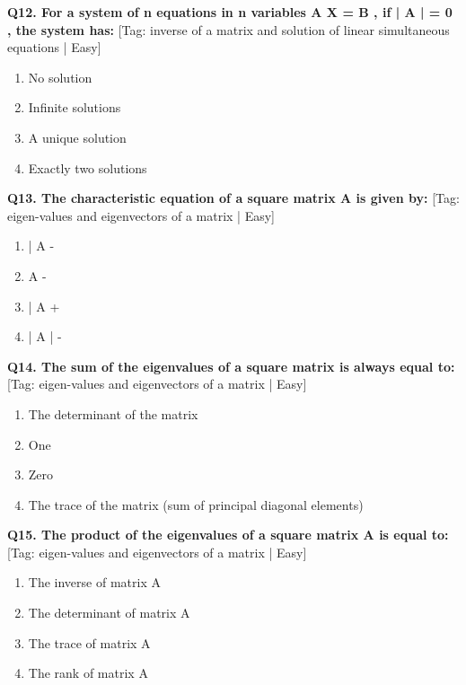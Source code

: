 \noindent\textbf{Q12. For a system of n equations in n variables A X = B , if | A |  = 0 , the system has:} \hfill [Tag: inverse of a matrix and solution of linear simultaneous equations | Easy]
\begin{enumerate}[label=(\alph*),topsep=2pt,itemsep=1pt,partopsep=0pt,parsep=0pt]
    \item {{No solution}}
    \item {{Infinite solutions}}
    \item {{A unique solution}}
    \item {{Exactly two solutions}}
\end{enumerate}
\vspace{2mm}

\noindent\textbf{Q13. The characteristic equation of a square matrix A is given by:} \hfill [Tag: eigen-values and eigenvectors of a matrix | Easy]
\begin{enumerate}[label=(\alph*),topsep=2pt,itemsep=1pt,partopsep=0pt,parsep=0pt]
    \item {{| A -}}
    \item {{A -}}
    \item {{| A +}}
    \item {{| A | -}}
\end{enumerate}
\vspace{2mm}

\noindent\textbf{Q14. The sum of the eigenvalues of a square matrix is always equal to:} \hfill [Tag: eigen-values and eigenvectors of a matrix | Easy]
\begin{enumerate}[label=(\alph*),topsep=2pt,itemsep=1pt,partopsep=0pt,parsep=0pt]
    \item {{The determinant of the matrix}}
    \item {{One}}
    \item {{Zero}}
    \item {{The trace of the matrix (sum of principal diagonal elements)}}
\end{enumerate}
\vspace{2mm}

\noindent\textbf{Q15. The product of the eigenvalues of a square matrix A is equal to:} \hfill [Tag: eigen-values and eigenvectors of a matrix | Easy]
\begin{enumerate}[label=(\alph*),topsep=2pt,itemsep=1pt,partopsep=0pt,parsep=0pt]
    \item {{The inverse of matrix A}}
    \item {{The determinant of matrix A}}
    \item {{The trace of matrix A}}
    \item {{The rank of matrix A}}
\end{enumerate}
\vspace{2mm}

